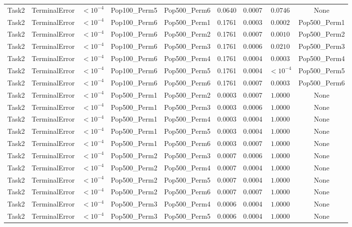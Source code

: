 \documentclass[8pt]{article}
\begin{document}
\begin{longtable}{llccccccc}
Task2 & TerminalError & $< 10^{-4}$ & Pop100\_Perm5 & Pop500\_Perm6 & 0.0640 & 0.0007 & $0.0746$ & None \\
Task2 & TerminalError & $< 10^{-4}$ & Pop100\_Perm6 & Pop500\_Perm1 & 0.1761 & 0.0003 & $0.0002$ & Pop500\_Perm1 \\
Task2 & TerminalError & $< 10^{-4}$ & Pop100\_Perm6 & Pop500\_Perm2 & 0.1761 & 0.0007 & $0.0010$ & Pop500\_Perm2 \\
Task2 & TerminalError & $< 10^{-4}$ & Pop100\_Perm6 & Pop500\_Perm3 & 0.1761 & 0.0006 & $0.0210$ & Pop500\_Perm3 \\
Task2 & TerminalError & $< 10^{-4}$ & Pop100\_Perm6 & Pop500\_Perm4 & 0.1761 & 0.0004 & $0.0003$ & Pop500\_Perm4 \\
Task2 & TerminalError & $< 10^{-4}$ & Pop100\_Perm6 & Pop500\_Perm5 & 0.1761 & 0.0004 & $< 10^{-4}$ & Pop500\_Perm5 \\
Task2 & TerminalError & $< 10^{-4}$ & Pop100\_Perm6 & Pop500\_Perm6 & 0.1761 & 0.0007 & $0.0003$ & Pop500\_Perm6 \\
Task2 & TerminalError & $< 10^{-4}$ & Pop500\_Perm1 & Pop500\_Perm2 & 0.0003 & 0.0007 & $1.0000$ & None \\
Task2 & TerminalError & $< 10^{-4}$ & Pop500\_Perm1 & Pop500\_Perm3 & 0.0003 & 0.0006 & $1.0000$ & None \\
Task2 & TerminalError & $< 10^{-4}$ & Pop500\_Perm1 & Pop500\_Perm4 & 0.0003 & 0.0004 & $1.0000$ & None \\
Task2 & TerminalError & $< 10^{-4}$ & Pop500\_Perm1 & Pop500\_Perm5 & 0.0003 & 0.0004 & $1.0000$ & None \\
Task2 & TerminalError & $< 10^{-4}$ & Pop500\_Perm1 & Pop500\_Perm6 & 0.0003 & 0.0007 & $1.0000$ & None \\
Task2 & TerminalError & $< 10^{-4}$ & Pop500\_Perm2 & Pop500\_Perm3 & 0.0007 & 0.0006 & $1.0000$ & None \\
Task2 & TerminalError & $< 10^{-4}$ & Pop500\_Perm2 & Pop500\_Perm4 & 0.0007 & 0.0004 & $1.0000$ & None \\
Task2 & TerminalError & $< 10^{-4}$ & Pop500\_Perm2 & Pop500\_Perm5 & 0.0007 & 0.0004 & $1.0000$ & None \\
Task2 & TerminalError & $< 10^{-4}$ & Pop500\_Perm2 & Pop500\_Perm6 & 0.0007 & 0.0007 & $1.0000$ & None \\
Task2 & TerminalError & $< 10^{-4}$ & Pop500\_Perm3 & Pop500\_Perm4 & 0.0006 & 0.0004 & $1.0000$ & None \\
Task2 & TerminalError & $< 10^{-4}$ & Pop500\_Perm3 & Pop500\_Perm5 & 0.0006 & 0.0004 & $1.0000$ & None \\

\end{longtable}
\end{document}
